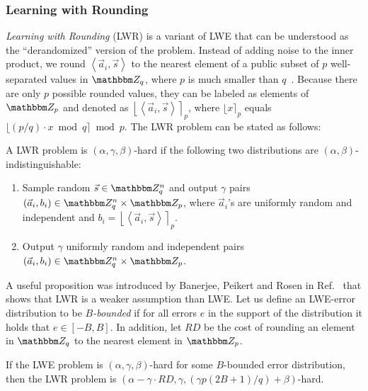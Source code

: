 \subsubsection{Learning with Rounding}
\emph{Learning with Rounding} (LWR) is a variant of LWE that can be understood as the ``derandomized'' version of the problem.
Instead of adding noise to the inner product, we round $\left\langle \vec{a}_i, \vec{s}\right\rangle$ to the nearest element of a public subset of $p$ well-separated values in $\Z_q$, where $p$ is much smaller than $q$~\cite{bogdanov2017pseudorandom}.
Because there are only $p$ possible rounded values, they can be labeled as elements of $\Z_p$ and denoted as $\left\lfloor\left\langle \vec{a}_i, \vec{s}\right\rangle\right\rceil_p$, where $\lfloor x \rceil_p$ equals $\lfloor (p/q)\cdot x \bmod q\rceil \bmod p$.
The LWR problem can be stated as follows:
\begin{definition}
	A LWR problem is $(\alpha, \gamma, \beta)$-hard if the following two distributions are $(\alpha, \beta)$-indistinguishable:
	\begin{enumerate}
		\item Sample random $\vec{s} \in \Z_q^n$ and output $\gamma$ pairs $\left(\vec{a}_i, b_i\right) \in \Z_q^n \times \Z_p$, where $\vec{a}_i$'s are uniformly random and independent and $b_i = \left\lfloor\left\langle \vec{a}_i, \vec{s}\right\rangle\right\rceil_p$.
		\item Output $\gamma$ uniformly random and independent pairs $\left(\vec{a}_i, b_i\right) \in \Z_q^n \times \Z_p$.
	\end{enumerate}
\end{definition}

A useful proposition was introduced by Banerjee, Peikert and Rosen in Ref.~\cite{banerjee2012pseudorandom} that shows that LWR is a weaker assumption than LWE.
Let us define an LWE-error distribution to be \emph{$B$-bounded} if for all errors $e$ in the support of the distribution it holds that $e \in [-B, B]$.
In addition, let $RD$ be the cost of rounding an element in $\Z_q$ to the nearest element in $\Z_p$.

\begin{proposition}\label{prop:lwe2lwr}
	If the LWE problem is $(\alpha, \gamma, \beta)$-hard for some $B$-bounded error distribution, then the LWR problem is $(\alpha-\gamma\cdot RD, \gamma, (\gamma p(2B+1)/q)+\beta)$-hard.
\end{proposition}

